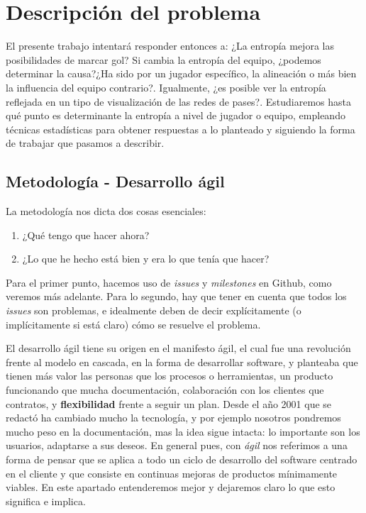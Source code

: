 \chapter{Descripción del problema}
\label{chap:descripcion}

El presente trabajo intentará responder entonces a: ¿La entropía mejora las
posibilidades de marcar gol? Si cambia la entropía del equipo, ¿podemos
determinar la causa?¿Ha sido por un jugador específico, la alineación o más bien
la influencia del equipo contrario?. Igualmente, ¿es posible ver la entropía
reflejada en un tipo de visualización de las redes de pases?. Estudiaremos hasta
qué punto es determinante la entropía a nivel de jugador o equipo, empleando
técnicas estadísticas para obtener respuestas a lo planteado y siguiendo la
forma de trabajar que pasamos a describir.

\section{Metodología - Desarrollo ágil}
La metodología nos dicta dos cosas esenciales:
\begin{enumerate}
    \item ¿Qué tengo que hacer ahora?
    \item ¿Lo que he hecho está bien y era lo que tenía que hacer?
\end{enumerate}

Para el primer punto, hacemos uso de \textit{issues} y \textit{milestones} en Github, 
como veremos más adelante. Para lo segundo, hay que tener en cuenta que todos 
los \textit{issues} son problemas, e idealmente deben de decir explícitamente 
(o implícitamente si está claro) cómo se resuelve el problema.

El desarrollo ágil tiene su origen en el manifesto ágil\cite{manifiesto-agil},
el cual fue una revolución frente al modelo en cascada, en la forma de
desarrollar software, y planteaba que tienen más valor las personas que los
procesos o herramientas, un producto funcionando que mucha documentación,
colaboración con los clientes que contratos, y \textbf{flexibilidad} frente a
seguir un plan. Desde el año 2001 que se redactó ha cambiado mucho la
tecnología, y por ejemplo nosotros pondremos mucho peso en la documentación, mas
la idea sigue intacta: lo importante son los usuarios, adaptarse a sus
deseos. En general pues, con \textit{ágil} nos referimos a una forma de pensar
que se aplica a todo un ciclo de desarrollo del software centrado en el cliente
y que consiste en continuas mejoras de productos mínimamente
viables\cite{agile-science}.  En este apartado entenderemos mejor y dejaremos
claro lo que esto significa e implica.

